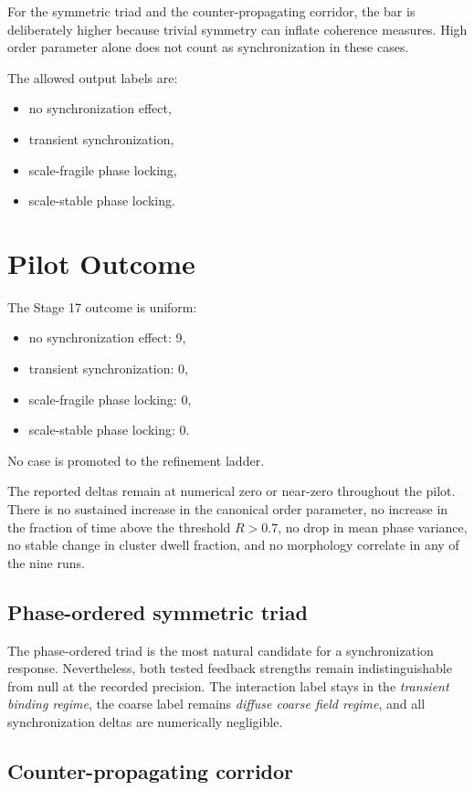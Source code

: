 \documentclass[11pt]{article}
\begin{document}
For the symmetric triad and the counter-propagating corridor, the bar is deliberately higher because trivial symmetry can inflate coherence measures. High order parameter alone does not count as synchronization in these cases.

The allowed output labels are:
\begin{itemize}
\item no synchronization effect,
\item transient synchronization,
\item scale-fragile phase locking,
\item scale-stable phase locking.
\end{itemize}

\section{Pilot Outcome}

The Stage 17 outcome is uniform:
\begin{itemize}
\item no synchronization effect: 9,
\item transient synchronization: 0,
\item scale-fragile phase locking: 0,
\item scale-stable phase locking: 0.
\end{itemize}

No case is promoted to the refinement ladder.

The reported deltas remain at numerical zero or near-zero throughout the pilot. There is no sustained increase in the canonical order parameter, no increase in the fraction of time above the threshold $R>0.7$, no drop in mean phase variance, no stable change in cluster dwell fraction, and no morphology correlate in any of the nine runs.

\subsection{Phase-ordered symmetric triad}

The phase-ordered triad is the most natural candidate for a synchronization response. Nevertheless, both tested feedback strengths remain indistinguishable from null at the recorded precision. The interaction label stays in the \emph{transient binding regime}, the coarse label remains \emph{diffuse coarse field regime}, and all synchronization deltas are numerically negligible.

\subsection{Counter-propagating corridor}
\end{document}
